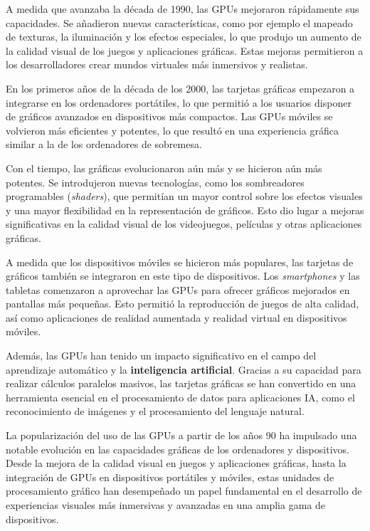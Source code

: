 A medida que avanzaba la década de 1990, las GPUs mejoraron rápidamente sus capacidades. Se añadieron nuevas características, como por ejemplo el mapeado de texturas, la iluminación y los efectos especiales, lo que produjo un aumento de la calidad visual de los juegos y aplicaciones gráficas. Estas mejoras permitieron a los desarrolladores crear mundos virtuales más inmersivos y realistas.

En los primeros años de la década de los 2000, las tarjetas gráficas empezaron a integrarse en los ordenadores portátiles, lo que permitió a los usuarios disponer de gráficos avanzados en dispositivos más compactos. Las GPUs móviles se volvieron más eficientes y potentes, lo que resultó en una experiencia gráfica similar a la de los ordenadores de sobremesa.

Con el tiempo, las gráficas evolucionaron aún más y se hicieron aún más potentes. Se introdujeron nuevas tecnologías, como los sombreadores programables (\textit{shaders}), que permitían un mayor control sobre los efectos visuales y una mayor flexibilidad en la representación de gráficos. Esto dio lugar a mejoras significativas en la calidad visual de los videojuegos, películas y otras aplicaciones gráficas.

A medida que los dispositivos móviles se hicieron más populares, las tarjetas de gráficos también se integraron en este tipo de dispositivos. Los \textit{smartphones} y las tabletas comenzaron a aprovechar las GPUs para ofrecer gráficos mejorados en pantallas más pequeñas. Esto permitió la reproducción de juegos de alta calidad, así como aplicaciones de realidad aumentada y realidad virtual en dispositivos móviles.

Además, las GPUs han tenido un impacto significativo en el campo del aprendizaje automático y la \textbf{inteligencia artificial}. Gracias a su capacidad para realizar cálculos paralelos masivos, las tarjetas gráficas se han convertido en una herramienta esencial en el procesamiento de datos para aplicaciones IA, como el reconocimiento de imágenes y el procesamiento del lenguaje natural.

La popularización del uso de las GPUs a partir de los años 90 ha impulsado una notable evolución en las capacidades gráficas de los ordenadores y dispositivos. Desde la mejora de la calidad visual en juegos y aplicaciones gráficas, hasta la integración de GPUs en dispositivos portátiles y móviles, estas unidades de procesamiento gráfico han desempeñado un papel fundamental en el desarrollo de experiencias visuales más inmersivas y avanzadas en una amplia gama de dispositivos.

